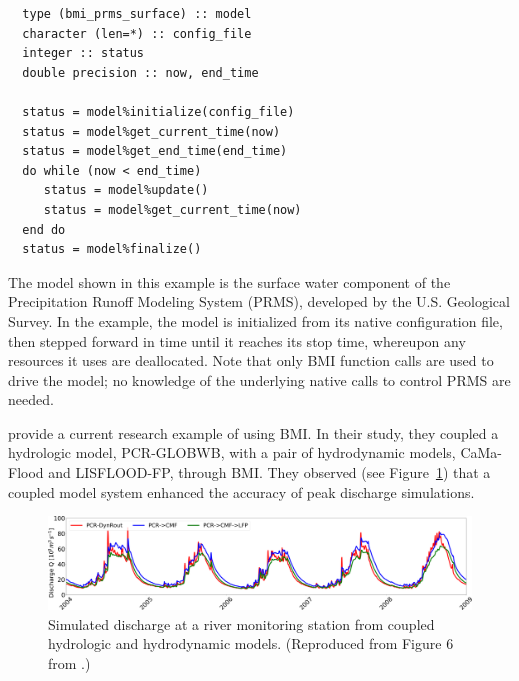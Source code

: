\documentclass[12pt]{amsart}
\begin{document}
\begin{listing}[ht]
\begin{verbatim}
  type (bmi_prms_surface) :: model
  character (len=*) :: config_file
  integer :: status
  double precision :: now, end_time

  status = model%initialize(config_file)
  status = model%get_current_time(now)
  status = model%get_end_time(end_time)
  do while (now < end_time)
     status = model%update()
     status = model%get_current_time(now)
  end do
  status = model%finalize()
\end{verbatim}
\label{listing:bmi_code}
\end{listing}

The model shown in this example
is the surface water component of the Precipitation Runoff Modeling System (PRMS),
developed by the U.S. Geological Survey.
In the example,
the model is initialized from its native configuration file,
then stepped forward in time until it reaches its stop time,
whereupon any resources it uses are deallocated.
Note that only BMI function calls are used to drive the model;
no knowledge of the underlying native calls to control PRMS are needed.

\citet{hoch2019evaluating} provide a current research example of using BMI. 
In their study,
they coupled a hydrologic model, PCR-GLOBWB,
with a pair of hydrodynamic models, CaMa-Flood and LISFLOOD-FP,
through BMI.
They observed (see Figure~\ref{fig:hoch_2019_fig6}) that a coupled model system
enhanced the accuracy of peak discharge simulations.

\begin{figure}[h!]
\centering
\includegraphics[scale=0.8]{Figures/nhess-19-1723-2019-f06.png}
\caption{Simulated discharge at a river monitoring station from coupled hydrologic and hydrodynamic models. (Reproduced from Figure 6 from \citet{hoch2019evaluating}.)}
\label{fig:hoch_2019_fig6}
\end{figure}
\end{document}
